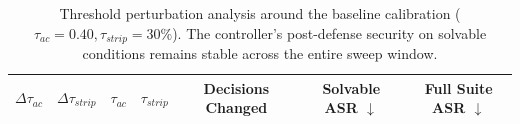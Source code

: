 \begin{table}[t]
\centering
\small
\caption{Threshold perturbation analysis around the baseline calibration ($\tau_{ac} = 0.40, \tau_{strip} = 30\%$). The controller's post-defense security on solvable conditions remains stable across the entire sweep window.}
\label{tab:threshold_sensitivity}
\begin{tabular}{cccc | ccc}
\hline
$\Delta \tau_{ac}$ & $\Delta \tau_{strip}$ & $\tau_{ac}$ & $\tau_{strip}$ & \textbf{Decisions Changed} & \textbf{Solvable ASR} $\downarrow$ & \textbf{Full Suite ASR} $\downarrow$ \\
\hline
\hline
\end{tabular}
\end{table}
